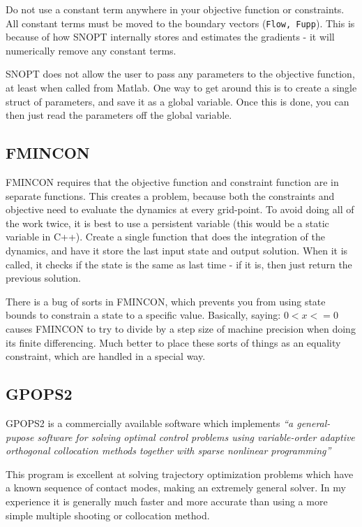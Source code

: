 	\par Do not use a constant term anywhere in your objective function or constraints. All constant terms must be moved to the boundary vectors (\texttt{Flow, Fupp}). This is because of how SNOPT internally stores and estimates the gradients - it will numerically remove any constant terms.

	\par SNOPT does not allow the user to pass any parameters to the objective function, at least when called from Matlab. One way to get around this is to create a single struct of parameters, and save it as a global variable. Once this is done, you can then just read the parameters off the global variable.


\subsection{FMINCON \cite{MatlabOptimizationToolbox2014}}

FMINCON requires that the objective function and constraint function are in separate functions. This creates a problem, because both the constraints and objective need to evaluate the dynamics at every grid-point. To avoid doing all of the work twice, it is best to use a persistent variable (this would be a static variable in C++). Create a single function that does the integration of the dynamics, and have it store the last input state and output solution. When it is called, it checks if the state is the same as last time - if it is, then just return the previous solution.

\par There is a bug of sorts in FMINCON, which prevents you from using state bounds to constrain a state to a specific value. Basically, saying: $0<x<=0$ causes FMINCON to try to divide by a step size of machine precision when doing its finite differencing. Much better to place these sorts of things as an equality constraint, which are handled in a special way. 



\subsection{GPOPS2 \cite{Patterson2013}}

GPOPS2 is a commercially available software which implements {\em ``a general-pupose software for solving optimal control problems using variable-order adaptive orthogonal collocation methods together with sparse nonlinear programming''}

This program is excellent at solving trajectory optimization problems which have a known sequence of contact modes, making an extremely general solver. In my experience it is generally much faster and more accurate than using a more simple multiple shooting or collocation method.
